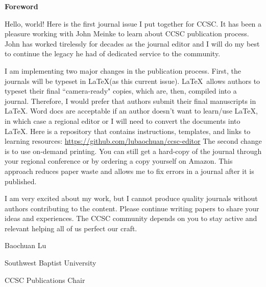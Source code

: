 \documentclass{article}
\begin{document}
\begingroup
  \centering
  \textbf{\LARGE Foreword}\\
\endgroup

\vspace{10pt}

Hello, world! Here is the first journal issue I put together for CCSC. It has been
a pleasure working with John Meinke to learn about CCSC publication process.
John has worked tirelessly for decades as the journal editor and I will do my
best to continue the legacy he had of dedicated service to the community.

I am implementing two major changes in the publication process. First, the
journals will be typeset in \LaTeX (as this current issue). \LaTeX\ allows authors
to typeset their final ``camera-ready" copies, which are, then, compiled into
a journal. Therefore,
I would prefer that authors submit their final manuscripts in \LaTeX. Word docs
are acceptable if an author doesn't want to learn/use \LaTeX, in which case a
regional editor or I will need to convert the documents into \LaTeX. Here is a
repository that contains instructions, templates, and links to learning
resources: \url{https://github.com/lubaochuan/ccsc-editor} The second change
is to use on-demand printing. You can still get a hard-copy of the journal
through your regional conference or by ordering a copy yourself on Amazon.
This approach reduces paper waste and allows me to fix errors in a journal
after it is published.

I am very excited about my work, but I cannot produce quality journals without
authors contributing to the content. Please continue writing papers to share your
ideas and experiences. The CCSC community depends
on you to stay active and relevant helping all of us perfect our craft.

\vspace{10pt}

\hfill Baochuan Lu

\hfill Southwest Baptist University

\hfill CCSC Publications Chair\\
\end{document}
